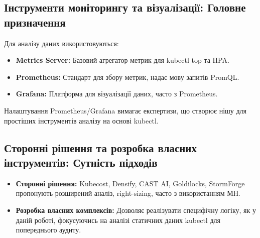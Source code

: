 \subsection{Інструменти моніторингу та візуалізації: Головне призначення}
Для аналізу даних використовуються:
\begin{itemize}
    \item \textbf{Metrics Server:} Базовий агрегатор метрик для kubectl top та HPA.
    \item \textbf{Prometheus:} Стандарт для збору метрик, надає мову запитів PromQL.
    \item \textbf{Grafana:} Платформа для візуалізації даних, часто з Prometheus.
\end{itemize}
Налаштування Prometheus/Grafana вимагає експертизи, що створює нішу для простіших інструментів аналізу на основі kubectl.

\subsection{Сторонні рішення та розробка власних інструментів: Сутність підходів}
\begin{itemize}
    \item \textbf{Сторонні рішення:} Kubecost, Densify, CAST AI, Goldilocks, StormForge пропонують розширений аналіз, right-sizing, часто з використанням МН.
    \item \textbf{Розробка власних комплексів:} Дозволяє реалізувати специфічну логіку, як у даній роботі, фокусуючись на аналізі статичних даних kubectl для попереднього аудиту.
\end{itemize}
